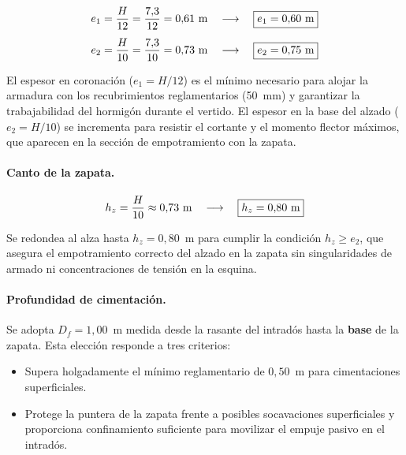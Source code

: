 \begin{align}
  e_1 &= \frac{H}{12} = \frac{7{,}3}{12} = 0{,}61~\text{m}
        \quad\longrightarrow\quad \boxed{e_1 = 0{,}60~\text{m}}
        \label{eq:e1_opc} \\[4pt]
  e_2 &= \frac{H}{10} = \frac{7{,}3}{10} = 0{,}73~\text{m}
        \quad\longrightarrow\quad \boxed{e_2 = 0{,}75~\text{m}}
        \label{eq:e2_opc}
\end{align}

El espesor en coronación ($e_1 = H/12$) es el mínimo necesario para alojar la
armadura con los recubrimientos reglamentarios (50~mm) y garantizar la
trabajabilidad del hormigón durante el vertido. El espesor en la base del alzado
($e_2 = H/10$) se incrementa para resistir el cortante y el momento flector
máximos, que aparecen en la sección de empotramiento con la zapata.

\paragraph{Canto de la zapata.}

\begin{equation}
  h_z = \frac{H}{10} \approx 0{,}73~\text{m}
        \quad\longrightarrow\quad \boxed{h_z = 0{,}80~\text{m}}
        \label{eq:hz_opc}
\end{equation}

Se redondea al alza hasta $h_z = 0{,}80$~m para cumplir la condición
$h_z \geq e_2$, que asegura el empotramiento correcto del alzado en la zapata
sin singularidades de armado ni concentraciones de tensión en la esquina.

\paragraph{Profundidad de cimentación.}

Se adopta $D_f = 1{,}00$~m medida desde la rasante del intradós hasta la
\textbf{base} de la zapata. Esta elección responde a tres criterios:
\begin{itemize}
  \item Supera holgadamente el mínimo reglamentario de $0{,}50$~m para
        cimentaciones superficiales.
  \item Protege la puntera de la zapata frente a posibles socavaciones
        superficiales y proporciona confinamiento suficiente para movilizar
        el empuje pasivo en el intradós.
\end{itemize}

